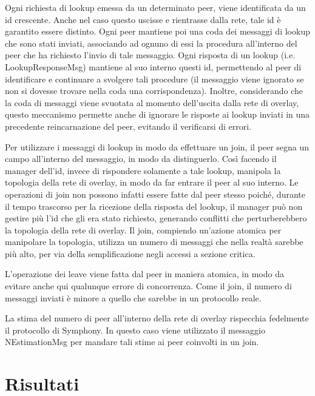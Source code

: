 \documentclass[prodmode,acmtap]{acmlarge}
\begin{document}
Ogni richiesta di lookup emessa da un determinato peer, viene identificata da un id crescente. Anche nel caso questo uscisse e rientrasse dalla rete, tale id è garantito essere distinto. Ogni peer mantiene poi una coda dei messaggi di lookup che sono stati inviati, associando ad ognuno di essi la procedura all'interno del peer che ha richiesto l'invio di tale messaggio. Ogni risposta di un lookup (i.e. LookupResponseMsg) mantiene al suo interno questi id, permettendo al peer di identificare e continuare a svolgere tali procedure (il messaggio viene ignorato se non si dovesse trovare nella coda una corrispondenza). Inoltre, considerando che la coda di messaggi viene svuotata al momento dell'uscita dalla rete di overlay, questo meccanismo permette anche di ignorare le risposte ai lookup inviati in una precedente reincarnazione del peer, evitando il verificarsi di errori.

Per utilizzare i messaggi di lookup in modo da effettuare un join, il peer segna un campo all'interno del messaggio, in modo da distinguerlo. Così facendo il manager dell'id, invece di rispondere solamente a tale lookup, manipola la topologia della rete di overlay, in modo da far entrare il peer al suo interno. Le operazioni di join non possono infatti essere fatte dal peer stesso poiché, durante il tempo trascorso per la ricezione della risposta del lookup, il manager può non gestire più l'id che gli era stato richiesto, generando conflitti che perturberebbero la topologia della rete di overlay. Il join, compiendo un'azione atomica per manipolare la topologia, utilizza un numero di messaggi che nella realtà sarebbe più alto, per via della semplificazione negli accessi a sezione critica.

L'operazione dei leave viene fatta dal peer in maniera atomica, in modo da evitare anche qui qualunque errore di concorrenza. Come il join, il numero di messaggi inviati è minore a quello che sarebbe in un protocollo reale.

La stima del numero di peer all'interno della rete di overlay rispecchia fedelmente il protocollo di Symphony. In questo caso viene utilizzato il messaggio NEstimationMsg per mandare tali stime ai peer coinvolti in un join.


\section{Risultati} \label{risultati}
\end{document}
